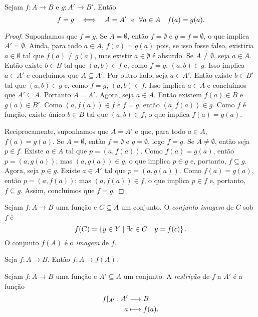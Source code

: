 \begin{prop}\label{conj:prop.func.ig}
Sejam $f: A \to B$ e $g:A' \to B'$. Então
	\begin{equation*}
	f=g \quad \Longleftrightarrow \quad A=A' \text{\ \ e\ \ } \forall a \in A \quad f(a)=g(a).
	\end{equation*}
\end{prop}
\begin{proof}
Suponhamos que $f=g$. Se $A=\emptyset$, então $f=\emptyset$ e $g=f=\emptyset$, o que implica $A'=\emptyset$. Ainda, para todo $a \in A$, $f(a)=g(a)$ pois, se isso fosse falso, existiria $a \in \emptyset$ tal que $f(a)\neq g(a)$, mas existir $a \in \emptyset$ é absurdo. Se $A \neq \emptyset$, seja $a \in A$. Então existe $b \in B$ tal que $(a,b) \in f$ e, como $f=g$, $(a,b) \in g$. Isso implica $a \in A'$ e concluímos que $A \subseteq A'$. Por outro lado, seja $a \in A'$. Então existe $b \in B'$ tal que $(a,b) \in g$ e, como $f=g$, $(a,b) \in f$. Isso implica $a \in A$ e concluímos que $A' \subseteq A$. Portanto $A=A'$. Agora, seja $a \in A$. Então existem $f(a) \in B$ e $g(a) \in B'$. Como $(a,f(a)) \in f$ e $f=g$, então $(a,f(a)) \in g$. Como $f$ é função, existe único $b \in B$ tal que $(a,b) \in f$, o que implica $f(a)=g(a)$.
	
Reciprocamente, suponhamos que $A=A'$ e que, para todo $a \in A$, $f(a)=g(a)$. Se $A=\emptyset$, então $f=\emptyset$ e $g=\emptyset$, logo $f=g$. Se $A \neq \emptyset$, então seja $p \in f$. Existe $a \in A$ tal que $p=(a,f(a))$. Como $f(a)=g(a)$, então $p=(a,g(a))$; mas $(a,g(a)) \in g$, o que implica $p \in g$ e, portanto, $f \subseteq g$. Agora, seja $p \in g$. Existe $a \in A'$ tal que $p=(a,g(a))$. Como $f(a)=g(a)$, então $p=(a,f(a))$; mas $(a,f(a)) \in f$, o que implica $p \in f$ e, portanto, $f \subseteq g$. Assim, concluímos que $f=g$.
\end{proof}

\begin{defi}
Sejam $f: A \to B$ uma função e $C \subseteq A$ um conjunto. O \emph{conjunto imagem} de $C$ sob $f$ é
	\begin{equation*}
	f(C)=\left\{y \in Y \;\middle\vert\; \exists c \in C \quad y=f(c) \right\}.
	\end{equation*}
O conjunto $f(A)$ é o \emph{imagem} de $f$.
\end{defi}

\begin{prop}
Seja $f: A \to B$. Então $f: A \to f(A)$.
\end{prop}

\begin{defi}
Sejam $f: A \to B$ uma função e $A' \subseteq A$ um conjunto. A \emph{restrição} de $f$ a $A'$ é a função
	\begin{align*}
	{f|_{A'}}: {A'} &\longrightarrow {B} \\{a} &\longmapsto {f(a)}.
	\end{align*}
\end{defi}

